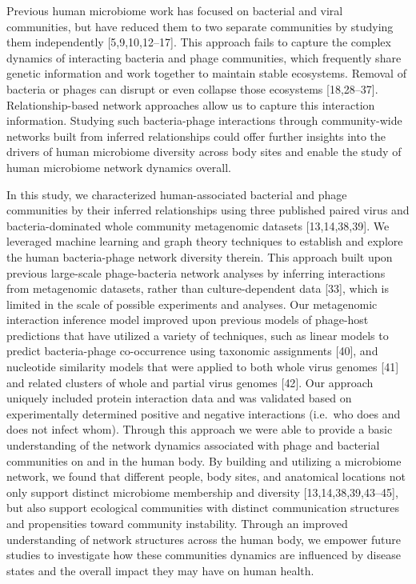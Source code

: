 \documentclass[12pt,]{article}
\begin{document}
Previous human microbiome work has focused on bacterial and viral
communities, but have reduced them to two separate communities by
studying them independently {[}5,9,10,12--17{]}. This approach fails to
capture the complex dynamics of interacting bacteria and phage
communities, which frequently share genetic information and work
together to maintain stable ecosystems. Removal of bacteria or phages
can disrupt or even collapse those ecosystems {[}18,28--37{]}.
Relationship-based network approaches allow us to capture this
interaction information. Studying such bacteria-phage interactions
through community-wide networks built from inferred relationships could
offer further insights into the drivers of human microbiome diversity
across body sites and enable the study of human microbiome network
dynamics overall.

In this study, we characterized human-associated bacterial and phage
communities by their inferred relationships using three published paired
virus and bacteria-dominated whole community metagenomic datasets
{[}13,14,38,39{]}. We leveraged machine learning and graph theory
techniques to establish and explore the human bacteria-phage network
diversity therein. This approach built upon previous large-scale
phage-bacteria network analyses by inferring interactions from
metagenomic datasets, rather than culture-dependent data {[}33{]}, which
is limited in the scale of possible experiments and analyses. Our
metagenomic interaction inference model improved upon previous models of
phage-host predictions that have utilized a variety of techniques, such
as linear models to predict bacteria-phage co-occurrence using taxonomic
assignments {[}40{]}, and nucleotide similarity models that were applied
to both whole virus genomes {[}41{]} and related clusters of whole and
partial virus genomes {[}42{]}. Our approach uniquely included protein
interaction data and was validated based on experimentally determined
positive and negative interactions (i.e.~who does and does not infect
whom). Through this approach we were able to provide a basic
understanding of the network dynamics associated with phage and
bacterial communities on and in the human body. By building and
utilizing a microbiome network, we found that different people, body
sites, and anatomical locations not only support distinct microbiome
membership and diversity {[}13,14,38,39,43--45{]}, but also support
ecological communities with distinct communication structures and
propensities toward community instability. Through an improved
understanding of network structures across the human body, we empower
future studies to investigate how these communities dynamics are
influenced by disease states and the overall impact they may have on
human health.
\end{document}
